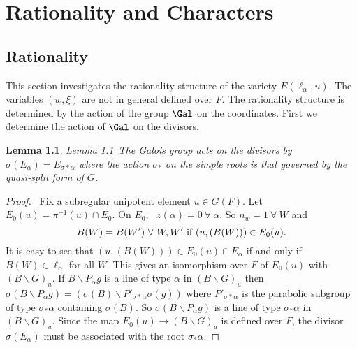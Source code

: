 \documentclass{memo-l}
\newtheorem{lemma}[theorem]{Lemma}
\theoremstyle{definition}
\theoremstyle{remark}
\numberwithin{section}{chapter}
\numberwithin{equation}{chapter}
\begin{document}


\chapter{Rationality and Characters} 
 




\section{Rationality}

   This section investigates the rationality structure of the variety
$E({\ell}_{{\alpha}},u)$.  The variables $(w,{\xi})$ are not in general
defined over $F$.  The rationality structure is determined by the action of
the group $\Gal$ on the coordinates.  First we determine the
action of $\Gal$ on the divisors.



\begin{lemma}{Lemma 1.1}\ The Galois group acts on the divisors by
${\sigma}(E_{{\alpha}}) = E_{{\sigma}*{\alpha}}$ where the action
${\sigma}_{*}$ on the simple roots is that governed by the quasi-split form
of $G$.
\end{lemma}

\begin{proof} \  Fix a subregular unipotent element $u  \in  G(F)$.  Let $E_{0}(u)
 =  {\pi}^{-1}(u)  \cap  E_{0}$.  On $E_{0}$, \  $z({\alpha}) = 0 {\ \forall\  }
{\alpha}$.  So $n_{w} = 1 {\ \forall\ } W$ and $$B(W) = B(W') {\ \forall\ }
W,W'\ \hbox{if} \  (u,(B(W)))  \in  E_{0}(u).$$ It is easy to see that $(u,(B(W)))
 \in  E_{0}(u)  \cap  E_{{\alpha}}$ if and only if $B(W)  \in 
{\ell}_{{\alpha}}$ for all $W$.  This gives an isomorphism over $F$ of
$E_{0}(u)$ with $(B\backslash G)_{u}$.  If $B\backslash P_{{\alpha}}g$ is a
line of type ${\alpha}$ in $(B\backslash G)_{u}$ then ${\sigma}(B\backslash
P_{{\alpha}}g)  =  ({\sigma}(B)\backslash P'_{{\sigma}*{\alpha}}{\sigma}(g))$
where $P'_{{\sigma}*{\alpha}}$ is the parabolic subgroup of type
${\sigma}_{*}{\alpha}$ containing ${\sigma}(B)$.  So ${\sigma}(B\backslash
P_{{\alpha}}g)$ is a line of type ${\sigma}_{*}{\alpha}$ in $(B\backslash
G)_{u}$.  Since the map $E_{0}(u) {\to} (B\backslash G)_{u}$ is defined
over $F$, the divisor ${\sigma}(E_{{\alpha}})$ must be associated with the
root ${\sigma}_{*}{\alpha}$.
\end{proof} 
\end{document}
